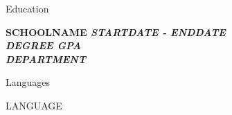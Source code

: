 \documentclass{resume} %
\begin{document}

\newcommand{\school}{\bf{SCHOOLNAME} \hfill \em {STARTDATE - ENDDATE}
\\ DEGREE \hfill { GPA }
\\ DEPARTMENT } 

\newcommand{\job}{
\begin{rSubsection}{POSITION}{STARTDATE - ENDDATE}{INSTITUTION}{}
\item TASK1
\item TASK2
\item TASK3
\end{rSubsection}
}

\newcommand{\award}{\item AWARD}

\newcommand{\languages}{\item LANGUAGE}

\newcommand{\skills}{
\begin{tabular}{ @{} >{\bfseries}l @{\hspace{6ex}} l }
SKILL &  EXAMPLE1, EXAMPLE2 \\
SKILL & EXAMPLE1, EXAMPLE2, EXAMPLE3 \\
\end{tabular}
}


\begin{rSection}{Education}

\school{}


\end{rSection}


\begin{rSection}{Languages}

\languages{}

\end{rSection}
\end{document}
